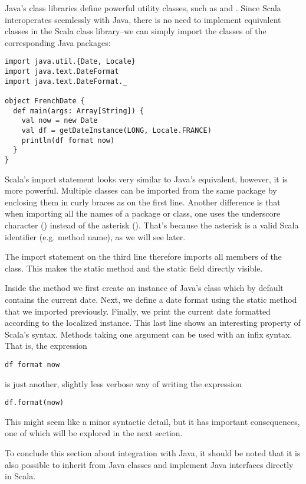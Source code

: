 \documentclass[a4paper,12pt,twoside,titlepage]{article}
\newcommand{\langname}[1]{#1\xspace}
\newcommand{\Scala}{\langname{Scala}}
\newcommand{\Java}{\langname{Java}}
\begin{document}
\Java's class libraries define powerful utility classes, such as
 and . Since \Scala interoperates
seemlessly with \Java, there is no need to implement equivalent
classes in the \Scala class library--we can simply import the classes
of the corresponding \Java packages:
\begin{lstlisting}
import java.util.{Date, Locale}
import java.text.DateFormat
import java.text.DateFormat._

object FrenchDate {
  def main(args: Array[String]) {
    val now = new Date
    val df = getDateInstance(LONG, Locale.FRANCE)
    println(df format now)
  }
}
\end{lstlisting}
\Scala's import statement looks very similar to \Java's equivalent,
however, it is more powerful. Multiple classes can be imported from
the same package by enclosing them in curly braces as on the first
line. Another difference is that when importing all the names of a
package or class, one uses the underscore character (\code{_}) instead
of the asterisk (\code{*}). That's because the asterisk is a valid
\Scala identifier (e.g. method name), as we will see later.

The import statement on the third line therefore imports all members
of the  class. This makes the static method
 and the static field  directly
visible.

Inside the  method we first create an instance of \Java's
 class which by default contains the current date. Next, we
define a date format using the static  method
that we imported previously. Finally, we print the current date
formatted according to the localized  instance. This
last line shows an interesting property of \Scala's syntax. Methods
taking one argument can be used with an infix syntax. That is, the
expression
\begin{lstlisting}
df format now
\end{lstlisting}
is just another, slightly less verbose way of writing the expression
\begin{lstlisting}
df.format(now)
\end{lstlisting}
This might seem like a minor syntactic detail, but it has important
consequences, one of which will be explored in the next section.

To conclude this section about integration with \Java, it should be
noted that it is also possible to inherit from \Java classes and
implement \Java interfaces directly in \Scala.
\end{document}
